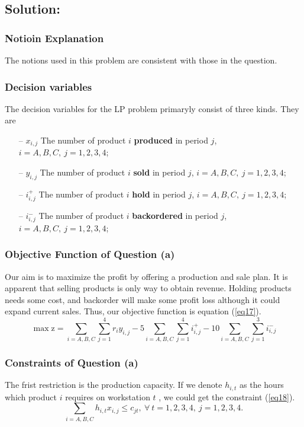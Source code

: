 \documentclass[12pt]{article}
\begin{document}
	\subsection{Solution:}
\subsubsection{Notioin Explanation}
The notions used in this problem are consistent with those in the question.
\subsubsection{Decision variables}
The decision variables for the LP problem primaryly consist of three kinds. They are
\begin{itemize}
\item [--] $x_{i,j}$ The number of product $i$ \textbf{produced} in period $j$, $i=A,B,C,\ j=1,2,3,4$;
\item [--]$y_{i,j}$ The number of product $i$ \textbf{sold} in period $j$, $i=A,B,C,\ j=1,2,3,4$;
\item [--] $i^+_{i,j}$ The number of product $i$ \textbf{hold} in period $j$, $i=A,B,C,\ j=1,2,3,4$;
\item [--] $i^-_{i,j}$ The number of product $i$ \textbf{backordered} in period $j$, $i=A,B,C,\ j=1,2,3,4$;
\end{itemize}
\subsubsection{Objective Function of Question (a)}
Our aim is to maximize the profit by offering a production and sale plan. It is apparent that selling products is only way to obtain revenue. Holding products needs some cost, and backorder will make some profit loss although it could expand current sales. Thus, our objective function is equation (\ref{eq17}).
\begin{equation}
	\label{eq17}
	\max \mathrm{z} = \sum\limits_{i=A,B,C}\sum\limits_{j=1}^4r_iy_{i,j}-5\sum\limits_{i=A,B,C}\sum\limits_{j=1}^4i^+_{i,j}-10\sum\limits_{i=A,B,C}\sum\limits_{j=1}^3i^-_{i,j}
\end{equation}
\subsubsection{Constraints of Question (a)}
The frist restriction is the production capacity. If we denote $h_{i,t}$ as the hours  which product $i$ requires on workstation $t$ , we could get the constraint (\ref{eq18}).
\begin{equation}
\label{eq18}
\sum\limits_{i=A,B,C}h_{i,t}x_{i,j}\leq c_{jt},\ \forall\ t=1,2,3,4,\ j=1,2,3,4.
\end{equation}
\end{document}
